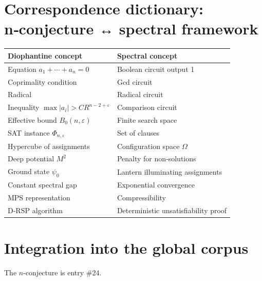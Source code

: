\documentclass[11pt,a4paper]{article}
\begin{document}
\section{Correspondence dictionary: n‑conjecture ↔ spectral framework}

\begin{center}
\small
\begin{tabular}{@{}l|l@{}}
\toprule
\textbf{Diophantine concept} & \textbf{Spectral concept} \\
\midrule
Equation $a_1+\cdots+a_n=0$ & Boolean circuit output 1 \\
Coprimality condition & Gcd circuit \\
Radical & Radical circuit \\
Inequality $\max|a_i| > C R^{n-2+\varepsilon}$ & Comparison circuit \\
Effective bound $B_0(n,\varepsilon)$ & Finite search space \\
SAT instance $\Phi_{n,\varepsilon}$ & Set of clauses \\
Hypercube of assignments & Configuration space $\Omega$ \\
Deep potential $M^2$ & Penalty for non‑solutions \\
Ground state $\psi_0$ & Lantern illuminating assignments \\
Constant spectral gap & Exponential convergence \\
MPS representation & Compressibility \\
D‑RSP algorithm & Deterministic unsatisfiability proof \\
\bottomrule
\end{tabular}
\end{center}

\section{Integration into the global corpus}

The $n$-conjecture is entry \#24.
\end{document}
